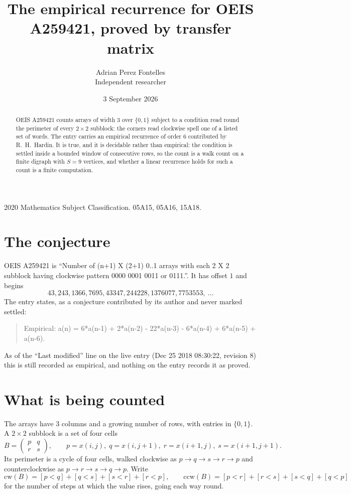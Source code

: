 \documentclass[11pt,a4paper]{article}
\title{The empirical recurrence for OEIS A259421, proved by transfer matrix}
\author{Adrian Perez Fontelles\\ \small Independent researcher}
\date{3 September 2026}
\theoremstyle{plain}
\theoremstyle{definition}
\begin{document}
\maketitle

\begin{abstract}
OEIS A259421 counts arrays of width $3$ over $\{0,1\}$ subject to a condition read round the
perimeter of every $2\times2$ subblock: the corners read clockwise spell one of a listed set of words. The entry carries an empirical recurrence of
order $6$ contributed by R.~H.~Hardin. It is true, and it is decidable rather than
empirical: the condition is settled inside a bounded window of consecutive rows, so the
count is a walk count on a finite digraph with $S=9$ vertices, and whether a linear
recurrence holds for such a count is a finite computation.
\end{abstract}

\noindent\small 2020 Mathematics Subject Classification. 05A15, 05A16, 15A18.\normalsize

\section{The conjecture}

OEIS A259421 is ``Number of (n+1) X (2+1) 0..1 arrays with each 2 X 2 subblock having clockwise pattern 0000 0001 0011 or 0111.''. It has offset $1$ and begins
\[
43, 243, 1366, 7695, 43347, 244228, 1376077, 7753553,\ \dots
\]
The entry states, as a conjecture contributed by its author and never marked settled:
\begin{quote}
Empirical: a(n) = 6*a(n-1) + 2*a(n-2) - 22*a(n-3) - 6*a(n-4) + 6*a(n-5) + a(n-6).
\end{quote}
As of the ``Last modified'' line on the live entry (Dec 25 2018 08:30:22, revision 8) this is still
recorded as empirical, and nothing on the entry records it as proved.

\section{What is being counted}

The arrays have $3$ columns and a growing number of rows, with entries in $\{0,1\}$. A
$2\times2$ subblock is a set of four cells
\[
B=\begin{pmatrix} p & q \\ r & s \end{pmatrix},
\qquad p=x(i,j),\; q=x(i,j+1),\; r=x(i+1,j),\; s=x(i+1,j+1).
\]
Its perimeter is a cycle of four cells, walked clockwise as $p\to q\to s\to r\to p$ and
counterclockwise as $p\to r\to s\to q\to p$. Write
\[
\mathrm{cw}(B)=[p<q]+[q<s]+[s<r]+[r<p],\qquad
\mathrm{ccw}(B)=[p<r]+[r<s]+[s<q]+[q<p]
\]
for the number of steps at which the value rises, going each way round.
\end{document}
